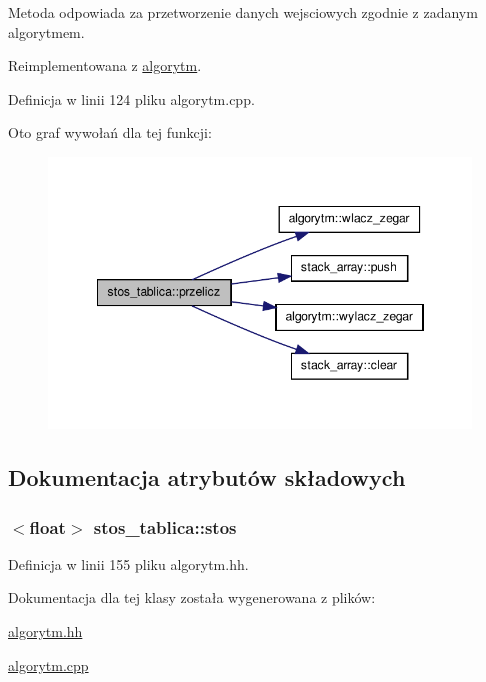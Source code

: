\-Metoda odpowiada za przetworzenie danych wejsciowych zgodnie z zadanym algorytmem. 



\-Reimplementowana z \hyperlink{classalgorytm_af3f92bf537b1f2e1f93173983e838449}{algorytm}.



\-Definicja w linii 124 pliku algorytm.\-cpp.



\-Oto graf wywołań dla tej funkcji\-:
\nopagebreak
\begin{figure}[H]
\begin{center}
\leavevmode
\includegraphics[width=346pt]{classstos__tablica_a44ec89c9723d4034e46ae3b51b01faea_cgraph}
\end{center}
\end{figure}




\subsection{\-Dokumentacja atrybutów składowych}
\hypertarget{classstos__tablica_a8aa72aa52bd2436cb12d9e1c8e077389}{
\subsubsection[{stos}]{$<$float$>$ {\bf stos\-\_\-tablica\-::stos}}}\label{classstos__tablica_a8aa72aa52bd2436cb12d9e1c8e077389}


\-Definicja w linii 155 pliku algorytm.\-hh.



\-Dokumentacja dla tej klasy została wygenerowana z plików\-:\begin{DoxyCompactItemize}
\item 
\hyperlink{algorytm_8hh}{algorytm.\-hh}\item 
\hyperlink{algorytm_8cpp}{algorytm.\-cpp}\end{DoxyCompactItemize}
